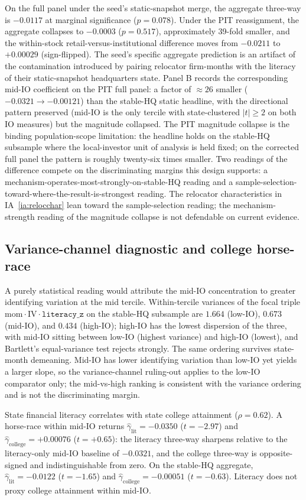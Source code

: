 On the full panel under the seed's static-snapshot merge, the aggregate three-way is $-0.0117$ at marginal significance ($p = 0.078$). Under the PIT reassignment, the aggregate collapses to $-0.0003$ ($p = 0.517$), approximately 39-fold smaller, and the within-stock retail-versus-institutional difference moves from $-0.0211$ to $+0.00029$ (sign-flipped). The seed's specific aggregate prediction is an artifact of the contamination introduced by pairing relocator firm-months with the literacy of their static-snapshot headquarters state. Panel B records the corresponding mid-IO coefficient on the PIT full panel: a factor of $\approx 26$ smaller ($-0.0321 \to -0.00121$) than the stable-HQ static headline, with the directional pattern preserved (mid-IO is the only tercile with state-clustered $|t|\geq 2$ on both IO measures) but the magnitude collapsed. The PIT magnitude collapse is the binding population-scope limitation: the headline holds on the stable-HQ subsample where the local-investor unit of analysis is held fixed; on the corrected full panel the pattern is roughly twenty-six times smaller. Two readings of the difference compete on the discriminating margins this design supports: a mechanism-operates-most-strongly-on-stable-HQ reading and a sample-selection-toward-where-the-result-is-strongest reading. The relocator characteristics in IA~\ref{ia:relocchar} lean toward the sample-selection reading; the mechanism-strength reading of the magnitude collapse is not defendable on current evidence.

\subsection{Variance-channel diagnostic and college horse-race}
\label{sec:variance}
\label{sec:college}

A purely statistical reading would attribute the mid-IO concentration to greater identifying variation at the mid tercile. Within-tercile variances of the focal triple $\mathrm{mom}\cdot\mathrm{IV}\cdot\mathtt{literacy\_z}$ on the stable-HQ subsample are $1.664$ (low-IO), $0.673$ (mid-IO), and $0.434$ (high-IO); high-IO has the lowest dispersion of the three, with mid-IO sitting between low-IO (highest variance) and high-IO (lowest), and Bartlett's equal-variance test rejects strongly. The same ordering survives state-month demeaning. Mid-IO has lower identifying variation than low-IO yet yields a larger slope, so the variance-channel ruling-out applies to the low-IO comparator only; the mid-vs-high ranking is consistent with the variance ordering and is not the discriminating margin.

State financial literacy correlates with state college attainment ($\rho = 0.62$). A horse-race within mid-IO returns $\hat\gamma_{\text{lit}} = -0.0350$ ($t = -2.97$) and $\hat\gamma_{\text{college}} = +0.00076$ ($t = +0.65$): the literacy three-way sharpens relative to the literacy-only mid-IO baseline of $-0.0321$, and the college three-way is opposite-signed and indistinguishable from zero. On the stable-HQ aggregate, $\hat\gamma_{\text{lit}} = -0.0122$ ($t = -1.65$) and $\hat\gamma_{\text{college}} = -0.00051$ ($t = -0.63$). Literacy does not proxy college attainment within mid-IO.
